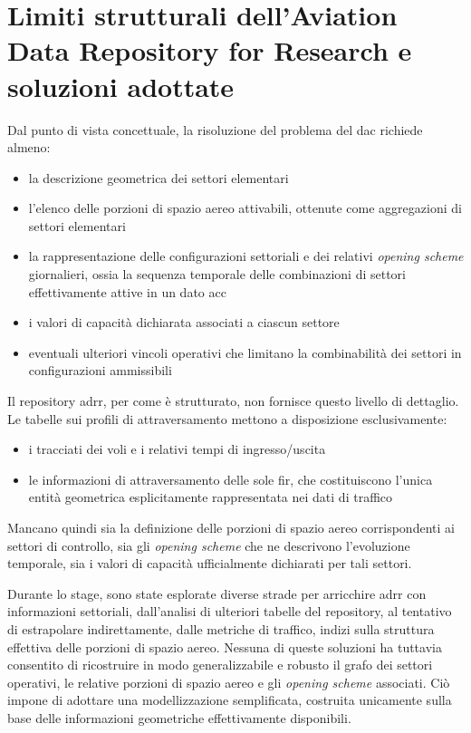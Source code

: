\section{Limiti strutturali dell'Aviation Data Repository for Research e soluzioni adottate}
\label{sec:limitiadrr}
Dal punto di vista concettuale, la risoluzione del problema del \gls{dac} richiede almeno:
\begin{itemize}
  \item la descrizione geometrica dei settori elementari
  \item l’elenco delle porzioni di spazio aereo attivabili, ottenute come aggregazioni di settori elementari 
  \item la rappresentazione delle configurazioni settoriali e dei relativi \emph{opening scheme} giornalieri, ossia la sequenza temporale delle combinazioni di settori effettivamente attive in un dato \gls{acc}
  \item i valori di capacità dichiarata associati a ciascun settore
  \item eventuali ulteriori vincoli operativi che limitano la combinabilità dei settori in configurazioni ammissibili
\end{itemize}
Il repository \gls{adrr}, per come è strutturato, non fornisce questo livello di dettaglio.  
Le tabelle sui profili di attraversamento mettono a disposizione esclusivamente:
\begin{itemize}
  \item i tracciati dei voli e i relativi tempi di ingresso/uscita
  \item le informazioni di attraversamento delle sole \gls{fir}, che costituiscono l’unica entità geometrica esplicitamente rappresentata nei dati di traffico
\end{itemize}

Mancano quindi sia la definizione delle porzioni di spazio aereo corrispondenti ai settori di controllo, sia gli \emph{opening scheme} che ne descrivono l’evoluzione temporale, sia i valori di capacità ufficialmente dichiarati per tali settori.

Durante lo stage, sono state esplorate diverse strade per arricchire \gls{adrr} con informazioni settoriali, dall’analisi di ulteriori tabelle del repository, al tentativo di estrapolare indirettamente, dalle metriche di traffico, indizi sulla struttura effettiva delle porzioni di spazio aereo.  
Nessuna di queste soluzioni ha tuttavia consentito di ricostruire in modo generalizzabile e robusto il grafo dei settori operativi, le relative porzioni di spazio aereo e gli \emph{opening scheme} associati. Ciò impone di adottare una modellizzazione semplificata, costruita unicamente sulla base delle informazioni geometriche effettivamente disponibili.

